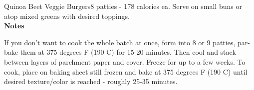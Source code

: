 \begin{recipe}{Quinoa Beet Veggie Burgers}{8 patties - 178 calories ea.}{}
Serve on small buns or atop mixed greens with desired toppings.\\

\textbf{Notes}

If you don’t want to cook the whole batch at once, form into 8 or 9 patties, par-bake them at 375 degrees F (190 C) for 15-20 minutes. Then cool and stack between layers of parchment paper and cover. Freeze for up to a few weeks. To cook, place on baking sheet still frozen and bake at 375 degrees F (190 C) until desired texture/color is reached - roughly 25-35 minutes.

\end{recipe}